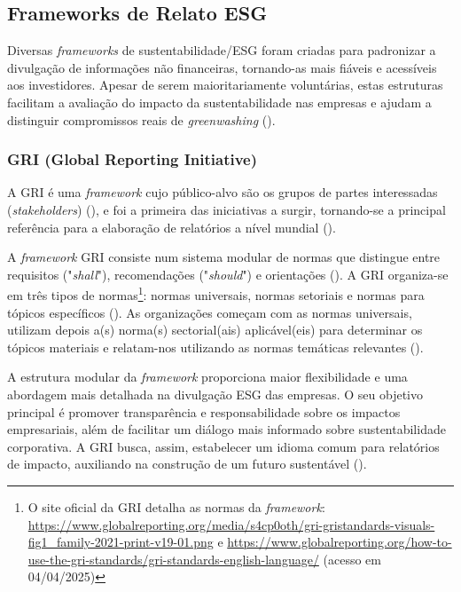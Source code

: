 \subsection{Frameworks de Relato ESG}
\label{subsec: FRESG}

Diversas \textit{frameworks} de sustentabilidade/ESG foram criadas para padronizar a divulgação de informações não financeiras, tornando-as mais fiáveis e acessíveis aos investidores. Apesar de serem maioritariamente voluntárias, estas estruturas facilitam a avaliação do impacto da sustentabilidade nas empresas e ajudam a distinguir compromissos reais de \textit{greenwashing} (\cite{Cruz2023}).

\subsubsection{GRI (Global Reporting Initiative)}
\label{subsubsec: GRI}

A \gls{GRI} é uma \textit{framework} cujo público-alvo são os grupos de partes interessadas (\textit{stakeholders}) (\cite{GRISASB2021}), e foi a primeira das iniciativas a surgir, tornando-se a principal referência para a elaboração de relatórios a nível mundial (\cite{Luque-Vlchez2023}).

A \textit{framework} GRI consiste num sistema modular de normas que distingue entre requisitos ("\textit{shall}"), recomendações ("\textit{should}") e orientações (\cite{Adams2022}). A \gls{GRI} organiza-se em três tipos de normas\footnote{O site oficial da \gls{GRI} detalha as normas da \textit{framework}: \url{https://www.globalreporting.org/media/s4cp0oth/gri-gristandards-visuals-fig1_family-2021-print-v19-01.png} e \url{https://www.globalreporting.org/how-to-use-the-gri-standards/gri-standards-english-language/} (acesso em 04/04/2025)}: normas universais, normas setoriais e normas para tópicos específicos (\cite{GRI2025}). As organizações começam com as normas universais, utilizam depois a(s) norma(s) sectorial(ais) aplicável(eis) para determinar os tópicos materiais e relatam-nos utilizando as normas temáticas relevantes (\cite{GRISector2025}).

A estrutura modular da \textit{framework} proporciona maior flexibilidade e uma abordagem mais detalhada na divulgação ESG das empresas. O seu objetivo principal é promover transparência e responsabilidade sobre os impactos empresariais, além de facilitar um diálogo mais informado sobre sustentabilidade corporativa. A GRI busca, assim, estabelecer um idioma comum para relatórios de impacto, auxiliando na construção de um futuro sustentável (\cite{Adams2022}).

